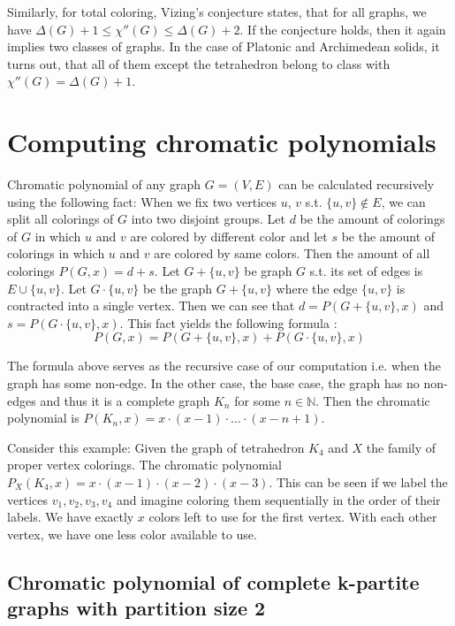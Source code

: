 Similarly, for total coloring, Vizing's conjecture \cite{vizing68} states, that for all graphs, we have $\Delta(G) + 1 \leq \chi''(G) \leq \Delta(G) + 2$. If the conjecture holds, then it again implies two classes of graphs. In the case of Platonic and Archimedean solids, it turns out, that all of them except the tetrahedron belong to class with $\chi''(G) = \Delta(G) + 1$.

\section{Computing chromatic polynomials}


Chromatic polynomial of any graph $G=(V,E)$ can be calculated recursively using the following fact: When we fix two vertices $u$, $v$ s.t. $\{u,v\} \notin E$, we can split all colorings of $G$ into two disjoint groups. Let $d$ be the amount of colorings of $G$ in which $u$ and $v$ are colored by different color and let $s$ be the amount of colorings in which $u$ and $v$ are colored by same colors. Then the amount of all colorings $P(G,x) = d + s$. Let $G+\{u,v\}$ be graph $G$ s.t. its set of edges is $E \cup \{u,v\}$. Let $G \cdot \{u,v\}$ be the graph $G + \{u,v\}$ where the edge $\{u,v\}$ is contracted into a single vertex. Then we can see that $d = P(G + \{u,v\},x)$ and $s = P(G \cdot \{u,v\},x)$. This fact yields the following formula \cite{chartrand2019}:
\begin{equation}\label{eqn:chrom_poly_nonedge}
 P(G,x) = P(G + \{u,v\},x) + P(G \cdot \{u,v\},x)
\end{equation}

The formula above serves as the recursive case of our computation i.e. when the graph has some non-edge. In the other case, the base case, the graph has no non-edges and thus it is a complete graph $K_n$ for some $n \in \mathbb{N}$. Then the chromatic polynomial is $P(K_n,x) = x \cdot (x-1) \cdot \ldots \cdot (x-n+1)$.

Consider this example: Given the graph of tetrahedron $K_4$ and $X$ the family of proper vertex colorings. The chromatic polynomial $P_{X}(K_4,x) = x \cdot (x-1) \cdot (x-2) \cdot (x-3)$. This can be seen if we label the vertices $v_1,v_2,v_3,v_4$ and imagine coloring them sequentially in the order of their labels. We have exactly $x$ colors left to use for the first vertex. With each other vertex, we have one less color available to use. 

\subsection{Chromatic polynomial of complete k-partite graphs with partition size 2}

